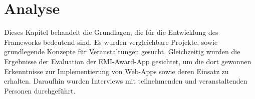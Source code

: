 \chapter{Analyse}


















Dieses Kapitel behandelt die Grundlagen, die für die Entwicklung des Frameworks
bedeutend sind. Es wurden vergleichbare Projekte, sowie grundlegende Konzepte
für Veranstaltungen gesucht. Gleichzeitig wurden die Ergebnisse der Evaluation
der EMI-Award-App gesichtet, um die dort gewonnen Erkenntnisse zur
Implementierung von Web-Apps sowie deren Einsatz zu erhalten. Daraufhin wurden
Interviews mit teilnehmenden und veranstaltenden Personen durchgeführt.

